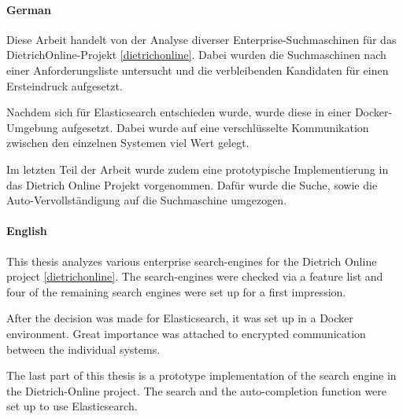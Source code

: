 \kurzfassung

\paragraph*{German}
Diese Arbeit handelt von der Analyse diverser Enterprise-Suchmaschinen für das DietrichOnline-Projekt \ref{dietrichonline}. Dabei wurden die Suchmaschinen nach einer Anforderungsliste untersucht und die verbleibenden Kandidaten für einen Ersteindruck aufgesetzt. 

Nachdem sich für Elasticsearch entschieden wurde, wurde diese in einer Docker-Umgebung aufgesetzt. Dabei wurde auf eine verschlüsselte Kommunikation zwischen den einzelnen Systemen viel Wert gelegt.

Im letzten Teil der Arbeit wurde zudem eine prototypische Implementierung in das Dietrich Online Projekt vorgenommen. Dafür wurde die Suche, sowie die Auto-Vervollständigung auf die Suchmaschine umgezogen.

\paragraph*{English}

This thesis analyzes various enterprise search-engines for the Dietrich Online project \ref{dietrichonline}. The search-engines were checked via a feature list and four of the remaining search engines were set up for a first impression.

After the decision was made for Elasticsearch, it was set up in a Docker environment. Great importance was attached to encrypted communication between the individual systems.

The last part of this thesis is a prototype implementation of the search engine in the Dietrich-Online project. The search and the auto-completion function were set up to use Elasticsearch.